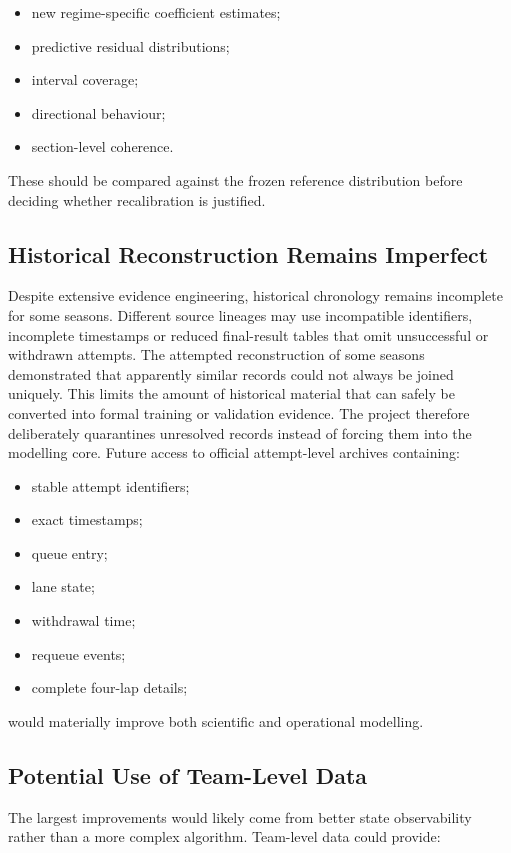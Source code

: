 \begin{itemize}
\item new regime-specific coefficient estimates;
\item predictive residual distributions;
\item interval coverage;
\item directional behaviour;
\item section-level coherence.
\end{itemize}

These should be compared against the frozen reference distribution before deciding whether recalibration is justified.

\subsection{Historical Reconstruction Remains Imperfect}
Despite extensive evidence engineering, historical chronology remains incomplete for some seasons. Different source lineages may use incompatible identifiers, incomplete timestamps or reduced final-result tables that omit unsuccessful or withdrawn attempts. The attempted reconstruction of some seasons demonstrated that apparently similar records could not always be joined uniquely. This limits the amount of historical material that can safely be converted into formal training or validation evidence. The project therefore deliberately quarantines unresolved records instead of forcing them into the modelling core. Future access to official attempt-level archives containing:

\begin{itemize}
\item stable attempt identifiers;
\item exact timestamps;
\item queue entry;
\item lane state;
\item withdrawal time;
\item requeue events;
\item complete four-lap details;
\end{itemize}

would materially improve both scientific and operational modelling.

\subsection{Potential Use of Team-Level Data}
The largest improvements would likely come from better state observability rather than a more complex algorithm. Team-level data could provide:

